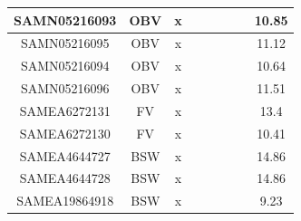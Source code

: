 \documentclass[../main.tex]{subfiles}
\begin{document}
\begin{flushleft}
\begin{footnotesize}
\begin{longtable}{|c|c|c|c|c|c|c|}
    \hline
    SAMN05216093  & OBV   & x                                                            & ~          & ~                                                                           & ~                                                                 & 10.85     \\ 
    \hline
    SAMN05216095  & OBV   & x                                                            & ~          & ~                                                                           & ~                                                                 & 11.12     \\ 
    \hline
    SAMN05216094  & OBV   & x                                                            & ~          & ~                                                                           & ~                                                                 & 10.64     \\ 
    \hline
    SAMN05216096  & OBV   & x                                                            & ~          & ~                                                                           & ~                                                                 & 11.51     \\ 
    \hline
    SAMEA6272131  & FV    & x                                                            & ~          & ~                                                                           & ~                                                                 & 13.4      \\ 
    \hline
    SAMEA6272130  & FV    & x                                                            & ~          & ~                                                                           & ~                                                                 & 10.41     \\ 
    \hline
    SAMEA4644727  & BSW   & x                                                            & ~          & ~                                                                           & ~                                                                 & 14.86     \\ 
    \hline
    SAMEA4644728  & BSW   & x                                                            & ~          & ~                                                                           & ~                                                                 & 14.86     \\ 
    \hline
    SAMEA19864918 & BSW   & x                                                            & ~          & ~                                                                           & ~                                                                 & 9.23      \\ 

\end{longtable}
\end{footnotesize}
\end{flushleft}
\end{document}
